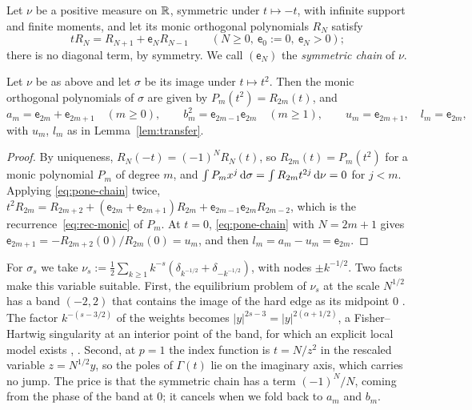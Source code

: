 Let $\nu$ be a positive measure on $\mathbb{R}$, symmetric under $t\mapsto-t$, with infinite support and finite moments, and let
its monic orthogonal polynomials $R_N$ satisfy
\begin{equation}\label{eq:pone-chain}
  tR_N=R_{N+1}+\mathsf e_NR_{N-1}\qquad(N\ge0,\ \mathsf e_0:=0,\ \mathsf e_N>0);
\end{equation}
there is no diagonal term, by symmetry. We call $(\mathsf e_N)$ the \emph{symmetric chain} of $\nu$.

\begin{lemma}[Folding]\label{lem:pone-fold}
Let $\nu$ be as above and let $\sigma$ be its image under $t\mapsto t^2$. Then the monic orthogonal polynomials of
$\sigma$ are given by $P_m(t^2)=R_{2m}(t)$, and
\[
  a_m=\mathsf e_{2m}+\mathsf e_{2m+1}\quad(m\ge0),\qquad b_m^2=\mathsf e_{2m-1}\mathsf e_{2m}\quad(m\ge1),\qquad
  u_m=\mathsf e_{2m+1},\quad l_m=\mathsf e_{2m},
\]
with $u_m$, $l_m$ as in Lemma~\textup{\ref{lem:transfer}}.
\end{lemma}

\begin{proof}
By uniqueness, $R_N(-t)=(-1)^NR_N(t)$, so $R_{2m}(t)=P_m(t^2)$ for a monic polynomial $P_m$ of degree $m$, and
$\int P_mx^j\,\mathrm{d}\sigma=\int R_{2m}t^{2j}\,\mathrm{d}\nu=0$ for $j<m$. Applying \eqref{eq:pone-chain} twice,
$t^2R_{2m}=R_{2m+2}+(\mathsf e_{2m}+\mathsf e_{2m+1})R_{2m}+\mathsf e_{2m-1}\mathsf e_{2m}R_{2m-2}$, which is the
recurrence~\eqref{eq:rec-monic} of $P_m$. At $t=0$, \eqref{eq:pone-chain} with $N=2m+1$ gives
$\mathsf e_{2m+1}=-R_{2m+2}(0)/R_{2m}(0)=u_m$, and then $l_m=a_m-u_m=\mathsf e_{2m}$.
\end{proof}

For $\sigma_s$ we take $\nu_s:=\frac12\sum_{k\ge1}k^{-s}(\delta_{k^{-1/2}}+\delta_{-k^{-1/2}})$, with nodes $\pm k^{-1/2}$.
Two facts make this variable suitable. First, the equilibrium problem of $\nu_s$ at the scale $N^{1/2}$ has a band
$(-2,2)$ that contains the image of the hard edge as its midpoint $0$ \cite[(2.1)]{WLXZ}. The factor $k^{-(s-3/2)}$
of the weights becomes $|y|^{2s-3}=|y|^{2(\alpha+1/2)}$, a Fisher--Hartwig singularity at an interior point of the band,
for which an explicit local model exists \cite[\S5]{KV}, \cite[\S4]{Van}. Second, at $p=1$ the index function is
$t=N/z^2$ in the rescaled variable $z=N^{1/2}y$, so the poles of $\Gamma(t)$ lie on the imaginary axis, which carries
no jump. The price is that the symmetric chain has a term $(-1)^N/N$, coming from the phase of the band at $0$; it
cancels when we fold back to $a_m$ and $b_m$.

